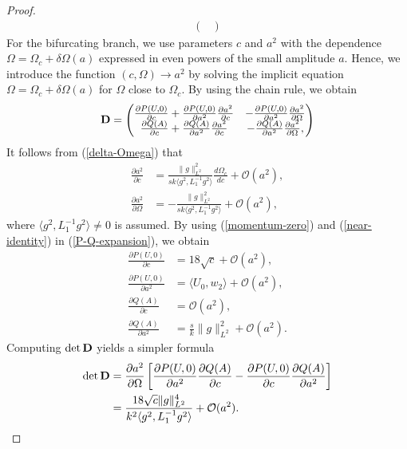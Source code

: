 \documentclass[12pt,reqno]{amsart}
\numberwithin{equation}{section}
\begin{document}
\begin{proof}
\begin{align*}
\begin{pmatrix}
\end{pmatrix}
\end{align*}
For the bifurcating branch, we use parameters $c$ and $a^2$ with the dependence $\Omega = \Omega_c + \delta \Omega(a)$ 
expressed in even powers of the small amplitude $a$. Hence, we introduce the function $(c,\Omega) \to a^2$ by solving the 
implicit equation $\Omega = \Omega_c + \delta \Omega(a)$ for $\Omega$ close to $\Omega_c$. By using the chain rule, 
we obtain 
\begin{align*}
{\bf D} = \begin{pmatrix}
    \frac{\partial P(U,0)}{\partial c} + \frac{\partial P(U,0)}{\partial a^2} \frac{\partial a^2}{\partial c} 
    & -\frac{\partial P(U,0)}{\partial a^2} \frac{\partial a^2}{\partial \Omega} \\
    \frac{\partial Q(A)}{\partial c} + \frac{\partial Q(A)}{\partial a^2} \frac{\partial a^2}{\partial c} 
    & -\frac{\partial Q(A)}{\partial a^2} \frac{\partial a^2}{\partial \Omega},  
\end{pmatrix}
\end{align*}
It follows from (\ref{delta-Omega}) that 
\begin{align*}
\frac{\partial a^2}{\partial c} &= \frac{\| g \|^2_{L^2}}{s k \langle g^2, L_1^{-1} g^2 \rangle} \frac{d \Omega_c}{d c} + \mathcal{O}(a^2), \\
\frac{\partial a^2}{\partial \Omega} &= -\frac{\| g \|^2_{L^2}}{s k \langle g^2, L_1^{-1} g^2 \rangle} + \mathcal{O}(a^2),
\end{align*}
where $\langle g^2, L_1^{-1} g^2 \rangle \neq 0$ is assumed. 
By using (\ref{momentum-zero}) and (\ref{near-identity}) in (\ref{P-Q-expansion}), we obtain 
\begin{align*}
 \frac{\partial P(U,0)}{\partial c} &= 18 \sqrt{c} + \mathcal{O}(a^2), \\
  \frac{\partial P(U,0)}{\partial a^2} &= \langle U_0, w_2 \rangle + \mathcal{O}(a^2), \\
  \frac{\partial Q(A)}{\partial c} &= \mathcal{O}(a^2), \\
  \frac{\partial Q(A)}{\partial a^2} & = \frac{s}{k} \| g \|^2_{L^2} + \mathcal{O}(a^2).
\end{align*}
Computing $\det {\bf D}$ yields a simpler formula 
\begin{align*}
    \det {\bf D} &= \frac{\partial a^2}{\partial \Omega} \left[ \frac{\partial P(U,0)}{\partial a^2} \frac{\partial Q(A)}{\partial c} - \frac{\partial P(U,0)}{\partial c} \frac{\partial Q(A)}{\partial a^2} \right] \\
    &= \frac{18 \sqrt{c} \| g \|^4_{L^2}}{k^2 \langle g^2, L_1^{-1} g^2 \rangle} + \mathcal{O}(a^2).
\end{align*}


\end{proof}
\end{document}
